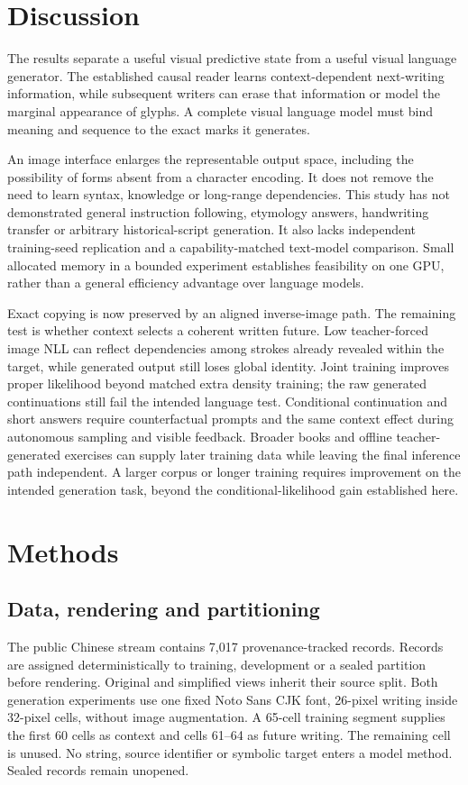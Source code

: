 \section*{Discussion}
The results separate a useful visual predictive state from a useful visual
language generator. The established causal reader learns context-dependent
next-writing information, while subsequent writers can erase that information
or model the marginal appearance of glyphs. A complete visual language model
must bind meaning and sequence to the exact marks it generates.

An image interface enlarges the representable output space, including the
possibility of forms absent from a character encoding. It does not remove the
need to learn syntax, knowledge or long-range dependencies. This study has not
demonstrated general instruction following, etymology answers, handwriting
transfer or arbitrary historical-script generation. It also lacks independent
training-seed replication and a capability-matched text-model comparison.
Small allocated memory in a bounded experiment establishes feasibility on one
GPU, rather than a general efficiency advantage over language models.

Exact copying is now preserved by an aligned inverse-image path. The remaining
test is whether context selects a coherent written future. Low teacher-forced
image NLL can reflect dependencies among strokes already revealed within the
target, while generated output still loses global identity. Joint training
improves proper likelihood beyond matched extra density training; the raw
generated continuations still fail the intended language test. Conditional
continuation and short answers require counterfactual prompts and the same
context effect during autonomous sampling and visible feedback.
Broader books and offline teacher-generated exercises can supply later
training data while leaving the final inference path independent. A larger
corpus or longer training requires improvement on the intended generation
task, beyond the conditional-likelihood gain established here.

\section*{Methods}
\subsection*{Data, rendering and partitioning}
The public Chinese stream contains 7,017 provenance-tracked records. Records
are assigned deterministically to training, development or a sealed partition
before rendering. Original and simplified views inherit their source split.
Both generation experiments use one fixed Noto Sans CJK font, 26-pixel writing
inside 32-pixel cells, without image augmentation. A 65-cell training segment
supplies the first 60 cells as context and cells 61--64 as future writing.
The remaining cell is unused. No string, source identifier or symbolic target
enters a model method. Sealed records remain unopened.


